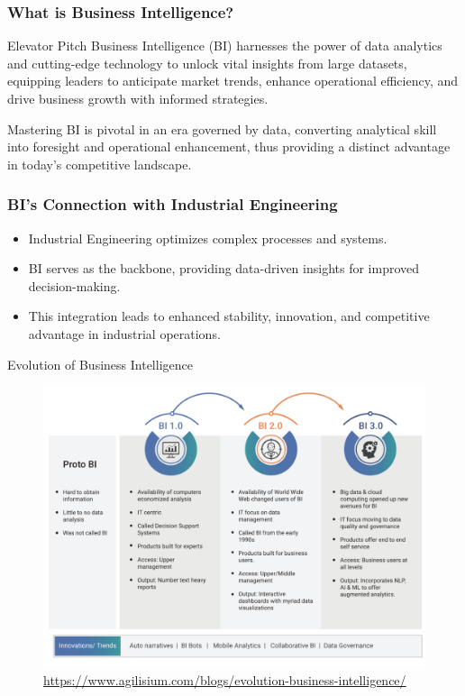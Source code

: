 \documentclass[
    NAME={Dr. Helga Ingimundardóttir},
    EMAIL={helgaingim@hi.is},
    FACULTY={Industrial Engineering},
    TITLE={Business Intelligence},
    SUBTITLE={Introduction},
    SEMINAR={IÐN610M},
    DATE={Spring, 2024}
]{HI-LaTeX/hi-beamer}
\begin{document}
    \begin{frame}
        \frametitle{What is Business Intelligence?}
        \begin{block}{Elevator Pitch}
            Business Intelligence (BI) harnesses the power of data analytics and cutting-edge technology to unlock
            vital insights from large datasets, equipping leaders to anticipate market trends, enhance operational
            efficiency, and drive business growth with informed strategies.
        \end{block}
        Mastering BI is pivotal in an era governed by data, converting analytical skill into foresight and
        operational enhancement, thus providing a distinct advantage in today's competitive landscape.
    \end{frame}

    \begin{frame}
        \frametitle{BI's Connection with Industrial Engineering}
        \begin{itemize}
            \item Industrial Engineering optimizes complex processes and systems.
            \item BI serves as the backbone, providing data-driven insights for improved decision-making.
            \item This integration leads to enhanced stability, innovation, and competitive advantage in industrial operations.
        \end{itemize}

    \end{frame}

    \begin{frame}{Evolution of Business Intelligence}
        \begin{figure}[h]
            \centering
            \includegraphics[height=0.75\textheight]{figures/evolution-business-intelligence.png}
            \caption{\tiny \url{https://www.agilisium.com/blogs/evolution-business-intelligence/}}
            \label{fig:evolution-of-business-intelligence}
        \end{figure}
    \end{frame}
\end{document}
